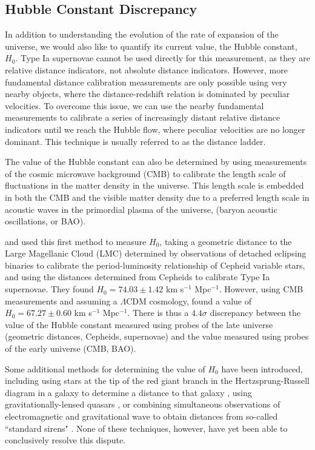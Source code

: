 \subsection{Hubble Constant Discrepancy}
In addition to understanding the evolution of the rate of expansion of the universe, we would also like to quantify its current value, the Hubble constant, $H_0$. Type Ia supernovae cannot be used directly for this measurement, as they are relative distance indicators, not absolute distance indicators. However, more fundamental distance calibration measurements are only possible using very nearby objects, where the distance-redshift relation is dominated by peculiar velocities. To overcome this issue, we can use the nearby fundamental measurements to calibrate a series of increasingly distant relative distance indicators until we reach the Hubble flow, where peculiar velocities are no longer dominant. This technique is usually referred to as the distance ladder.

The value of the Hubble constant can also be determined by using measurements of the cosmic microwave background (CMB) to calibrate the length scale of fluctuations in the matter density in the universe. This length scale is embedded in both the CMB and the visible matter density due to a preferred length scale in acoustic waves in the primordial plasma of the universe, (baryon acoustic oscillations, or BAO).

\citet{riess_24_2016} and \citet{riess_large_2019} used this first method to measure $H_0$, taking a geometric distance to the Large Magellanic Cloud (LMC) determined by observations of detached eclipsing binaries to calibrate the period-luminosity relationship of Cepheid variable stars, and using the distances determined from Cepheids to calibrate Type Ia supernovae. They found $H_0=74.03 \pm 1.42$ km s$^{-1}$ Mpc$^{-1}$. However, using CMB measurements and assuming a $\Lambda$CDM cosmology, \citet{planck_collaboration_planck_2016} found a value of $H_0=67.27 \pm 0.60$ km s$^{-1}$ Mpc$^{-1}$. There is thus a $4.4\sigma$ discrepancy between the value of the Hubble constant measured using probes of the late universe (geometric distances, Cepheids, supernovae) and the value measured using probes of the early universe (CMB, BAO).

Some additional methods for determining the value of $H_0$ have been introduced, including using stars at the tip of the red giant branch in the Hertzsprung-Russell diagram in a galaxy to determine a distance to that galaxy \citep{freedman_calibration_2020}, using gravitationally-lensed quasars \citep{bonvin_h0licow_2017}, or combining simultaneous observations of electromagnetic and gravitational wave to obtain distances from so-called ``standard sirens" \citep{holz_using_2005}. None of these techniques, however, have yet been able to conclusively resolve this dispute.

